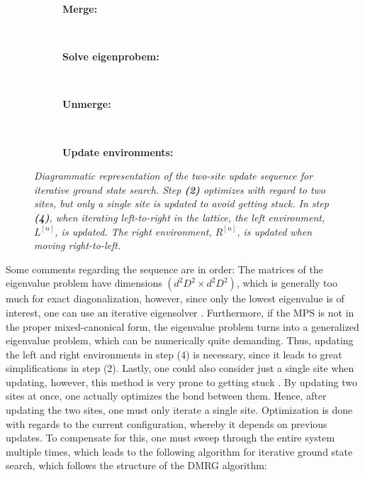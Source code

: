 \renewcommand{\thesubfigure}{\arabic{subfigure}}
\begin{figure}[h!]
	\centering
	\begin{subfigure}{\textwidth}
		\centering
		\caption{\textbf{Merge:}}
		
	\end{subfigure}\\[.25cm]
	
	\begin{subfigure}{\textwidth}
		\centering
		\caption{\textbf{Solve eigenprobem:}}
		
	\end{subfigure}\\[.25cm]

	\begin{subfigure}{\textwidth}
		\centering
		\caption{\textbf{Unmerge:}}
		
	\end{subfigure}\\[.25cm]

	\begin{subfigure}{\textwidth}
		\centering
		\caption{\textbf{Update environments:}}
		
	\end{subfigure}
	
	
	\caption{\textit{Diagrammatic representation of the two-site update sequence for iterative ground state search. Step \textbf{(2)} optimizes with regard to two sites, but only a single site is updated to avoid getting stuck. In step \textbf{(4)}, when iterating left-to-right in the lattice, the left environment, $L^{[n]}$, is updated. The right environment, $R^{[n]}$, is updated when moving right-to-left.}}
	\label{fig:twoSiteUpdate}
\end{figure}

Some comments regarding the sequence are in order: The matrices of the eigenvalue problem have dimensions $( d^2 D^2 \times d^2 D^2)$, which is generally too much for exact diagonalization, however, since only the lowest eigenvalue is of interest, one can use an iterative eigensolver \cite{Lanczos}. Furthermore, if the MPS is not in the proper mixed-canonical form, the eigenvalue problem turns into a generalized eigenvalue problem, which can be numerically quite demanding. Thus, updating the left and right environments in step (4) is necessary, since it leads to great simplifications in step (2). Lastly, one could also consider just a single site when updating, however, this method is very prone to getting stuck \cite{White2005}. By updating two sites at once, one actually optimizes the bond between them. Hence, after updating the two sites, one must only iterate a single site. Optimization is done with regards to the current configuration, whereby it depends on previous updates. To compensate for this, one must sweep through the entire system multiple times, which leads to the following algorithm for iterative ground state search, which follows the structure of the DMRG algorithm:


